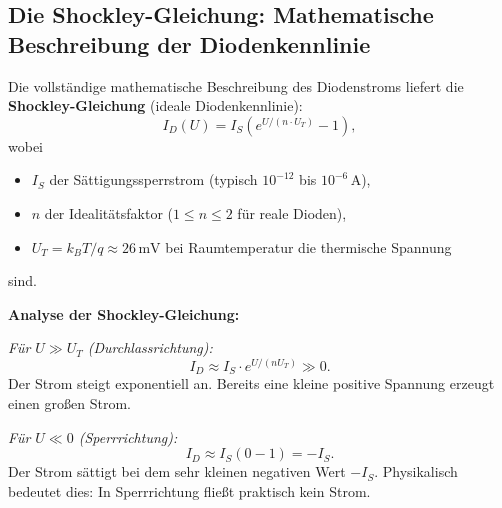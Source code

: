 ﻿\documentclass[12pt, a4paper]{article}
\begin{document}
	\subsection{Die Shockley-Gleichung: Mathematische Beschreibung der Diodenkennlinie}
	
	Die vollständige mathematische Beschreibung des Diodenstroms liefert die
	\textbf{Shockley-Gleichung} (ideale Diodenkennlinie):
	\begin{equation}
		I_D(U) = I_S \left( e^{U / (n \cdot U_T)} - 1 \right),
		\label{eq:shockley}
	\end{equation}
	wobei
	\begin{itemize}
		\item $I_S$ der Sättigungssperrstrom (typisch $10^{-12}$ bis $10^{-6}\,\mathrm{A}$),
		\item $n$ der Idealitätsfaktor ($1 \leq n \leq 2$ für reale Dioden),
		\item $U_T = k_B T / q \approx 26\,\mathrm{mV}$ bei Raumtemperatur die thermische Spannung
	\end{itemize}
	sind.
	
	\textbf{Analyse der Shockley-Gleichung:}
	
	\textit{Für $U \gg U_T$ (Durchlassrichtung):}
	\begin{equation}
		I_D \approx I_S \cdot e^{U/(nU_T)} \gg 0.
	\end{equation}
	Der Strom steigt exponentiell an. Bereits eine kleine positive Spannung
	erzeugt einen großen Strom.
	
	\textit{Für $U \ll 0$ (Sperrrichtung):}
	\begin{equation}
		I_D \approx I_S \left(0 - 1\right) = -I_S.
	\end{equation}
	Der Strom sättigt bei dem sehr kleinen negativen Wert $-I_S$. Physikalisch
	bedeutet dies: In Sperrrichtung fließt praktisch kein Strom.
	
\end{document}
